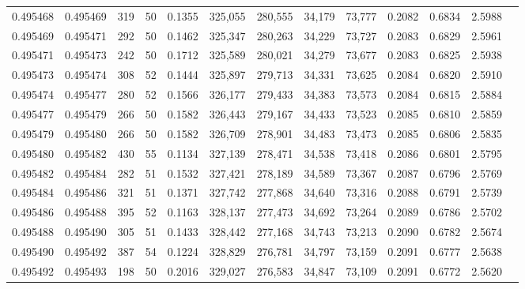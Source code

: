 \begin{tabular}{rrrrrrrrrrrrr}
0.495468 & 0.495469 &   319 &  50 &                                     0.1355 & 325,055 & 280,555 &  34,179 &  73,777 & 0.2082 & 0.6834 & 2.5988 \\
0.495469 & 0.495471 &   292 &  50 &                                     0.1462 & 325,347 & 280,263 &  34,229 &  73,727 & 0.2083 & 0.6829 & 2.5961 \\
0.495471 & 0.495473 &   242 &  50 &                                     0.1712 & 325,589 & 280,021 &  34,279 &  73,677 & 0.2083 & 0.6825 & 2.5938 \\
0.495473 & 0.495474 &   308 &  52 &                                     0.1444 & 325,897 & 279,713 &  34,331 &  73,625 & 0.2084 & 0.6820 & 2.5910 \\
0.495474 & 0.495477 &   280 &  52 &                                     0.1566 & 326,177 & 279,433 &  34,383 &  73,573 & 0.2084 & 0.6815 & 2.5884 \\
0.495477 & 0.495479 &   266 &  50 &                                     0.1582 & 326,443 & 279,167 &  34,433 &  73,523 & 0.2085 & 0.6810 & 2.5859 \\
0.495479 & 0.495480 &   266 &  50 &                                     0.1582 & 326,709 & 278,901 &  34,483 &  73,473 & 0.2085 & 0.6806 & 2.5835 \\
0.495480 & 0.495482 &   430 &  55 &                                     0.1134 & 327,139 & 278,471 &  34,538 &  73,418 & 0.2086 & 0.6801 & 2.5795 \\
0.495482 & 0.495484 &   282 &  51 &                                     0.1532 & 327,421 & 278,189 &  34,589 &  73,367 & 0.2087 & 0.6796 & 2.5769 \\
0.495484 & 0.495486 &   321 &  51 &                                     0.1371 & 327,742 & 277,868 &  34,640 &  73,316 & 0.2088 & 0.6791 & 2.5739 \\
0.495486 & 0.495488 &   395 &  52 &                                     0.1163 & 328,137 & 277,473 &  34,692 &  73,264 & 0.2089 & 0.6786 & 2.5702 \\
0.495488 & 0.495490 &   305 &  51 &                                     0.1433 & 328,442 & 277,168 &  34,743 &  73,213 & 0.2090 & 0.6782 & 2.5674 \\
0.495490 & 0.495492 &   387 &  54 &                                     0.1224 & 328,829 & 276,781 &  34,797 &  73,159 & 0.2091 & 0.6777 & 2.5638 \\
0.495492 & 0.495493 &   198 &  50 &                                     0.2016 & 329,027 & 276,583 &  34,847 &  73,109 & 0.2091 & 0.6772 & 2.5620 \\

\end{tabular}
